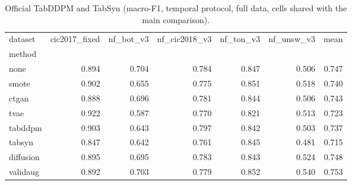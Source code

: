 \begin{table}[t]
\centering\small
\caption{Official TabDDPM and TabSyn (macro-F1, temporal protocol, full data, cells shared with the main comparison).}
\label{tab:tabsota}
\begin{tabular}{lrrrrrr}
\toprule
dataset & cic2017\_fixed & nf\_bot\_v3 & nf\_cic2018\_v3 & nf\_ton\_v3 & nf\_unsw\_v3 & mean \\
method &  &  &  &  &  &  \\
\midrule
none & 0.894 & 0.704 & 0.784 & 0.847 & 0.506 & 0.747 \\
smote & 0.902 & 0.655 & 0.775 & 0.851 & 0.518 & 0.740 \\
ctgan & 0.888 & 0.696 & 0.781 & 0.844 & 0.506 & 0.743 \\
tvae & 0.922 & 0.587 & 0.770 & 0.821 & 0.513 & 0.723 \\
tabddpm & 0.903 & 0.643 & 0.797 & 0.842 & 0.503 & 0.737 \\
tabsyn & 0.847 & 0.642 & 0.761 & 0.845 & 0.481 & 0.715 \\
diffusion & 0.895 & 0.695 & 0.783 & 0.843 & 0.524 & 0.748 \\
validaug & 0.892 & 0.703 & 0.779 & 0.852 & 0.540 & 0.753 \\
\bottomrule
\end{tabular}
\end{table}

